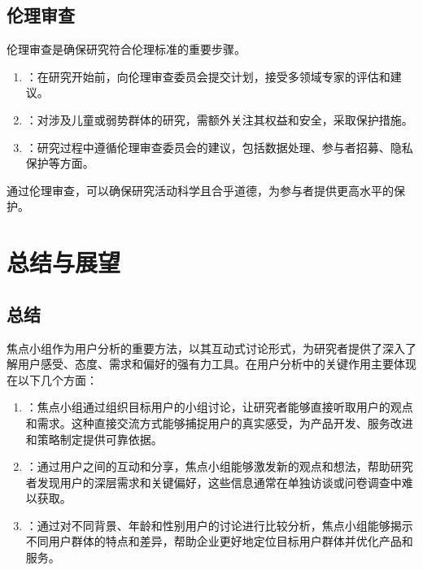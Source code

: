 \documentclass[letterpaper,10pt,english]{sphinxmanual}
\begin{document}
\subsection{伦理审查}
\label{\detokenize{user-research/focus-group:id43}}
\sphinxAtStartPar
伦理审查是确保研究符合伦理标准的重要步骤。
\begin{enumerate}
%
\item {} 
\sphinxAtStartPar
{}：在研究开始前，向伦理审查委员会提交计划，接受多领域专家的评估和建议。

\item {} 
\sphinxAtStartPar
{}：对涉及儿童或弱势群体的研究，需额外关注其权益和安全，采取保护措施。

\item {} 
\sphinxAtStartPar
{}：研究过程中遵循伦理审查委员会的建议，包括数据处理、参与者招募、隐私保护等方面。

\end{enumerate}

\sphinxAtStartPar
通过伦理审查，可以确保研究活动科学且合乎道德，为参与者提供更高水平的保护。


\section{总结与展望}
\label{\detokenize{user-research/focus-group:id44}}

\subsection{总结}
\label{\detokenize{user-research/focus-group:id45}}
\sphinxAtStartPar
焦点小组作为用户分析的重要方法，以其互动式讨论形式，为研究者提供了深入了解用户感受、态度、需求和偏好的强有力工具。在用户分析中的关键作用主要体现在以下几个方面：
\begin{enumerate}
%
\item {} 
\sphinxAtStartPar
{}：焦点小组通过组织目标用户的小组讨论，让研究者能够直接听取用户的观点和需求。这种直接交流方式能够捕捉用户的真实感受，为产品开发、服务改进和策略制定提供可靠依据。

\item {} 
\sphinxAtStartPar
{}：通过用户之间的互动和分享，焦点小组能够激发新的观点和想法，帮助研究者发现用户的深层需求和关键偏好，这些信息通常在单独访谈或问卷调查中难以获取。

\item {} 
\sphinxAtStartPar
{}：通过对不同背景、年龄和性别用户的讨论进行比较分析，焦点小组能够揭示不同用户群体的特点和差异，帮助企业更好地定位目标用户群体并优化产品和服务。

\end{enumerate}
\end{document}
